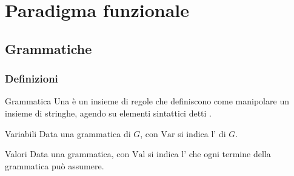 \documentclass[a4paper, 12pt]{report}
\begin{document}
    \chapter{Paradigma funzionale}

    \section{Grammatiche}
    
    \subsection{Definizioni}

    \begin{frameddefn}{Grammatica}
        Una  è un insieme di regole che definiscono come manipolare un insieme di stringhe, agendo su elementi sintattici detti .
    \end{frameddefn}

    \begin{frameddefn}{Variabili}
        Data una grammatica di $G$, con $\mathrm{Var}$ si indica l' di $G$.
    \end{frameddefn}

    \begin{frameddefn}{Valori}
        Data una grammatica, con $\mathrm{Val}$ si indica l' che ogni termine della grammatica può assumere.
    \end{frameddefn}
\end{document}
